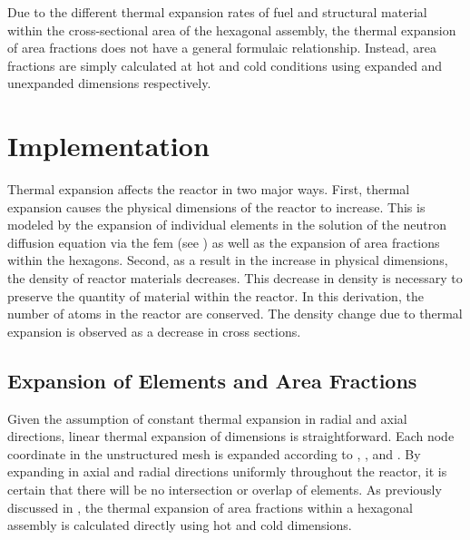     Due to the different thermal expansion rates of fuel and structural material 
    within the cross-sectional area of the hexagonal assembly, the thermal 
    expansion of area fractions does not have a general formulaic relationship.
    Instead, area fractions are simply calculated at hot and cold conditions
    using expanded and unexpanded dimensions respectively. 

\section{Implementation}
  Thermal expansion affects the reactor in two major ways. First, thermal
  expansion causes the physical dimensions of the reactor to increase. This is
  modeled by the expansion of individual elements in the solution of the neutron
  diffusion equation via the \gls{fem} (see ) as well
  as the expansion of area fractions within the hexagons. Second, as a result in
  the increase in physical dimensions, the density of reactor materials
  decreases. This decrease in density is necessary to preserve the quantity of
  material within the reactor.  In this derivation, the number of atoms in the
  reactor are conserved. The density change due to thermal expansion is observed
  as a decrease in cross sections.

  \subsection{Expansion of Elements and Area Fractions}
    Given the assumption of constant thermal expansion in radial and axial
    directions, linear thermal expansion of dimensions is straightforward. Each
    node coordinate in the unstructured mesh is expanded according to
    , , and . By expanding
    in axial and radial directions uniformly throughout the reactor, it is
    certain that there will be no intersection or overlap of elements. As
    previously discussed in ,
    the thermal expansion of area fractions within a hexagonal assembly is 
    calculated directly using hot and cold dimensions.

